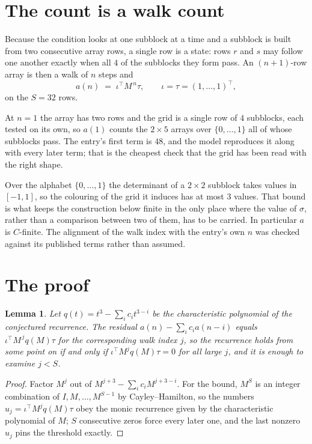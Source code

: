 \documentclass[11pt,a4paper]{article}
\theoremstyle{plain}
\newtheorem{lemma}[theorem]{Lemma}
\theoremstyle{definition}
\begin{document}
\section{The count is a walk count}

Because the condition looks at one subblock at a time and a subblock is
built from two consecutive array rows, a single row is a state: rows $r$ and $s$ may follow one
another exactly when all $4$ of the subblocks they form pass. An $(n+1)$-row array is then a
walk of $n$ steps and
\[
a(n)\;=\;\iota^{\!\top}M^{\,n}\tau,\qquad\iota=\tau=(1,\dots,1)^{\!\top},
\]
on the $S=32$ rows.

At $n=1$ the array has two rows and the grid is a single row of $4$
subblocks, each tested on its own, so $a(1)$ counts the
$2\times5$ arrays over $\{0,\dots,1\}$ all of whose subblocks pass. The entry's
first term is $48$, and the model reproduces it along with every later term; that is the
cheapest check that the grid has been read with the right shape.

Over the alphabet $\{0,\dots,1\}$ the determinant of a $2\times2$ subblock takes values in
$[-1,1]$, so the colouring of the grid it induces has at most $3$ values.
That bound is what keeps the construction below finite in the only place where the value of
$\sigma$, rather than a comparison between two of them, has to be carried.
In particular $a$ is $C$-finite. The alignment of the walk index with the entry's own $n$ was
checked against its published terms rather than assumed.

\section{The proof}

\begin{lemma}\label{lem:crit}
Let $q(t)=t^{3}-\sum_i c_it^{3-i}$ be the characteristic polynomial of the
conjectured recurrence. The residual $a(n)-\sum_ic_ia(n-i)$ equals
$\iota^{\!\top}M^{\,j}q(M)\tau$ for the corresponding walk index $j$, so the recurrence
holds from some point on if and only if $\iota^{\!\top}M^{j}q(M)\tau=0$ for all large $j$,
and it is enough to examine $j<S$.
\end{lemma}

\begin{proof}
Factor $M^{j}$ out of $M^{j+3}-\sum_ic_iM^{j+3-i}$. For the bound, $M^{S}$
is an integer combination of $I,M,\dots,M^{S-1}$ by Cayley--Hamilton, so the numbers
$u_j=\iota^{\!\top}M^{j}q(M)\tau$ obey the monic recurrence given by the characteristic
polynomial of $M$; $S$ consecutive zeros force every later one, and the last nonzero $u_j$
pins the threshold exactly.
\end{proof}
\end{document}

